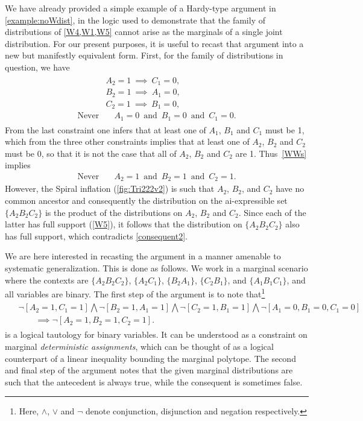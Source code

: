 \documentclass[aps,english,10pt,superscriptaddress,onecolumn,twoside,longbibliography,pra,floatfix,fleqn,nofootinbib]{revtex4-1}%
\theoremstyle{definition}
\newcounter{example}[section]
\newcommand{\eql}{=}
\begin{document}
We have already provided a simple example of a Hardy-type argument in \cref{example:noWdist}, in the logic used to demonstrate that the family of distributions of \cref{W4,W1,W5} cannot arise as the marginals of a single joint distribution. For our present purposes, it is useful to recast that argument into a new but manifestly equivalent form. First, for the family of distributions in question, we have
\begin{align} 
\begin{split}\label{WWs}
&A_2 = 1 \:\implies\: C_1 = 0,\\
&B_2 = 1 \:\implies\: A_1 = 0,\\
&C_2  = 1 \:\implies\: B_1  = 0,\\
\text{Never}  &\quad A_1  = 0\,\text{ and }\, B_1  = 0\,\text{ and }\, C_1  = 0.
\end{split}
\end{align}
From the last constraint one infers that at least one of $A_1$, $B_1$ and $C_1$ must be 1, which from the three other constraints implies that at least one of $A_2$, $B_2$ and $C_2$ must be 0, so that it is not the case that all of $A_2$, $B_2$ and $C_2$ are 1.  Thus~\cref{WWs} implies
\begin{align} \label{consequent2}
\text{Never}  \quad &A_2  = 1\,\text{ and }\, B_2  = 1\,\text{ and }\, C_2  = 1.
\end{align}
However, the Spiral inflation (\cref{fig:Tri222v2}) is such that $A_2$, $B_2$, and $C_2$ have no common ancestor and consequently the distribution on the ai-expressible set $\{A_2 B_2 C_2\}$ is the product of the distributions on $A_2$, $B_2$ and $C_2$.  Since each of the latter has full support (\cref{W5}), it follows that the distribution on $\{A_2 B_2 C_2\}$ also has full support, which contradicts \cref{consequent2}.

We are here interested in recasting the argument in a manner amenable to systematic generalization. This is done as follows. We work in a marginal scenario where the contexts are $\{A_2 B_2 C_2\}$, $\{A_2 C_1\}$, $\{B_2 A_1\}$, $\{C_2 B_1\}$, and  $\{A_1 B_1 C_1\}$, and all variables are binary. The first step of the argument is to note that\footnote{Here, $\land$, $\lor$ and $\lnot$ denote conjunction, disjunction and negation respectively.}
\begin{align}\begin{split}\label{tautology1}
&\lnot [A_2 \eql 1, C_1 \eql 1] \bigwedge \lnot [B_2 \eql 1, A_1 \eql 1] \bigwedge \lnot [C_2 \eql 1, B_1 \eql 1] \bigwedge \lnot [A_1 \eql 0, B_1 \eql 0, C_1 \eql 0]\\
 &\qquad\implies
\lnot [A_2 \eql 1, B_2 \eql 1, C_2 \eql 1].
\end{split}\end{align}
is a logical tautology for binary variables. It can be understood as a constraint on marginal {\em deterministic assignments}, which can be thought of as a logical counterpart of a linear inequality bounding the marginal polytope. The second and final step of the argument notes that the given marginal distributions are such that the antecedent is always true, while the consequent is sometimes false.
\end{document}

